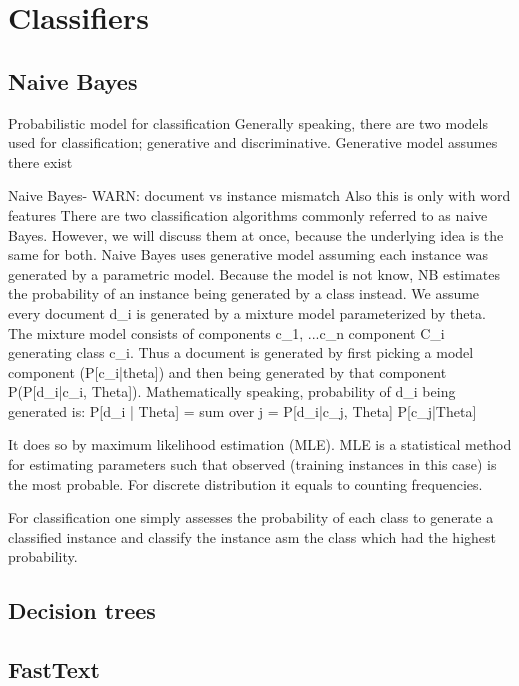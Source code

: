 \chapter{Classifiers}
\label{chap:clscon}

\section{Naive Bayes}
Probabilistic model for classification
Generally speaking, there are two models used for classification; generative and discriminative. Generative model assumes there exist 

Naive Bayes- WARN: document vs instance mismatch
Also this is only with word features
There are two classification algorithms commonly referred to as naive Bayes. However, we will discuss them at once, because the underlying idea is the same for both.
Naive Bayes uses generative model assuming each instance was generated by a parametric model. Because the model is not know, NB estimates the probability of an instance being generated by a class instead. We assume every document d\_i is generated by a mixture model parameterized by theta. The mixture model consists of components {c\_1, ...c\_n} component C\_i generating class c\_i. Thus a document is generated by first picking a model component (P[c\_i|theta]) and then being generated by that component P(P[d\_i|c\_i, Theta]).
Mathematically speaking, probability of d\_i being generated is:
P[d\_i | Theta] = sum over j = P[d\_i|c\_j, Theta] P[c\_j|Theta]


It  does so by maximum likelihood estimation (MLE).
MLE is a statistical method for estimating parameters such that observed (training instances in this case) is the most probable. For discrete distribution it equals to counting frequencies.
 
For classification one simply assesses the probability of each class to generate a classified instance and classify the instance asm the class which had the highest probability.

\section{Decision trees}

\section{FastText}


\section{}

\section{}

